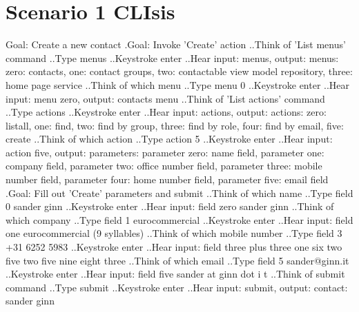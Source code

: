 \section{Scenario 1 CLIsis}
\label{section:scenario1clisis}
\begin{spverbatim}
Goal: Create a new contact
.Goal: Invoke 'Create' action
..Think of 'List menus' command
..Type menus
..Keystroke enter
..Hear input: menus, output: menus: zero: contacts, one: contact groups, two: contactable view model repository, three: home page service
..Think of which menu
..Type menu 0
..Keystroke enter
..Hear input: menu zero, output: contacts menu
..Think of 'List actions' command
..Type actions
..Keystroke enter
..Hear input: actions, output: actions: zero: listall, one: find, two: find by group, three: find by role, four: find by email, five: create
..Think of which action
..Type action 5
..Keystroke enter
..Hear input: action five, output: parameters: parameter zero: name field, parameter one: company field, parameter two: office number field, parameter three: mobile number field, parameter four: home number field, parameter five: email field
.Goal: Fill out 'Create' parameters and submit
..Think of which name
..Type field 0 sander ginn
..Keystroke enter
..Hear input: field zero sander ginn
..Think of which company
..Type field 1 eurocommercial
..Keystroke enter
..Hear input: field one eurocommercial (9 syllables) 
..Think of which mobile number
..Type field 3 +31 6252 5983
..Keystroke enter
..Hear input: field three plus three one six two five two five nine eight three
..Think of which email
..Type field 5 sander@ginn.it
..Keystroke enter
..Hear input: field five sander at ginn dot i t
..Think of submit command
..Type submit
..Keystroke enter
..Hear input: submit, output: contact: sander ginn
\end{spverbatim}

